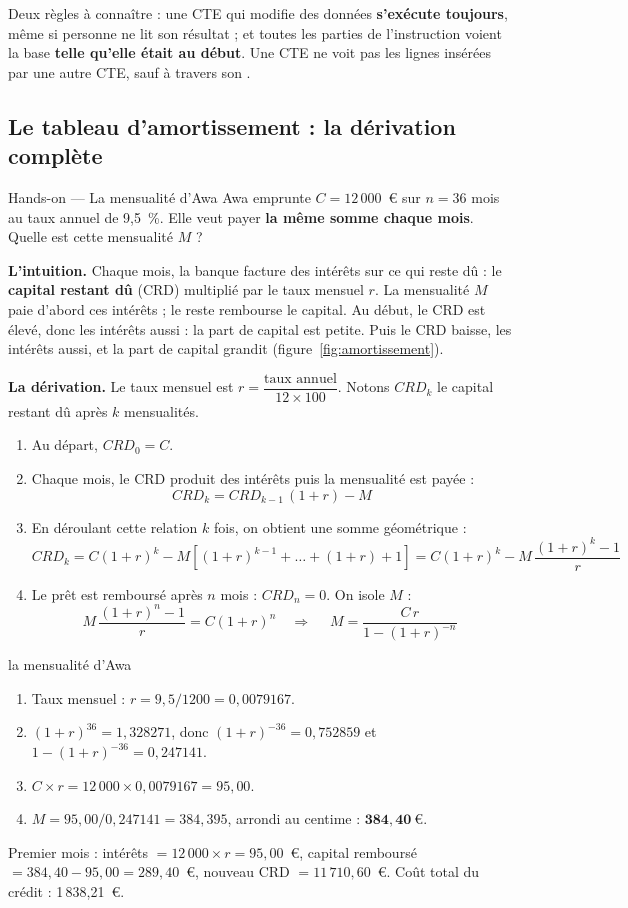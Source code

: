Deux règles à connaître : une CTE qui modifie des données \textbf{s'exécute toujours}, même si personne
ne lit son résultat ; et toutes les parties de l'instruction voient la base \textbf{telle qu'elle était
au début}. Une CTE ne voit pas les lignes insérées par une autre CTE, sauf à travers son
.

\subsection{Le tableau d'amortissement : la dérivation complète}

\begin{situation}{Hands-on --- La mensualité d'Awa}
Awa emprunte $C = 12\,000$~€ sur $n = 36$ mois au taux annuel de 9,5~\%. Elle veut payer \textbf{la même
somme chaque mois}. Quelle est cette mensualité $M$ ?
\end{situation}

\textbf{L'intuition.} Chaque mois, la banque facture des intérêts sur ce qui reste dû : le
\textbf{capital restant dû} (CRD) multiplié par le taux mensuel $r$. La mensualité $M$ paie d'abord ces
intérêts ; le reste rembourse le capital. Au début, le CRD est élevé, donc les intérêts aussi : la part
de capital est petite. Puis le CRD baisse, les intérêts aussi, et la part de capital grandit
(figure~\ref{fig:amortissement}).

\textbf{La dérivation.} Le taux mensuel est $r = \dfrac{\text{taux annuel}}{12 \times 100}$. Notons
$CRD_k$ le capital restant dû après $k$ mensualités.
\begin{enumerate}
\item Au départ, $CRD_0 = C$.
\item Chaque mois, le CRD produit des intérêts puis la mensualité est payée :
\[ CRD_k = CRD_{k-1}\,(1+r) - M \]
\item En déroulant cette relation $k$ fois, on obtient une somme géométrique :
\[ CRD_k = C(1+r)^k - M\left[(1+r)^{k-1} + \dots + (1+r) + 1\right]
         = C(1+r)^k - M\,\frac{(1+r)^k - 1}{r} \]
\item Le prêt est remboursé après $n$ mois : $CRD_n = 0$. On isole $M$ :
\[ M\,\frac{(1+r)^n - 1}{r} = C(1+r)^n \quad\Longrightarrow\quad
   \boxed{\;M = \frac{C \, r}{1 - (1+r)^{-n}}\;} \]
\end{enumerate}

\begin{calcul}{la mensualité d'Awa}
\begin{enumerate}
\item Taux mensuel : $r = 9{,}5 / 1200 = 0{,}0079167$.
\item $(1+r)^{36} = 1{,}328271$, donc $(1+r)^{-36} = 0{,}752859$ et $1 - (1+r)^{-36} = 0{,}247141$.
\item $C \times r = 12\,000 \times 0{,}0079167 = 95{,}00$.
\item $M = 95{,}00 / 0{,}247141 = 384{,}395$, arrondi au centime : $\mathbf{384{,}40~€}$.
\end{enumerate}
Premier mois : intérêts $= 12\,000 \times r = 95{,}00$~€, capital remboursé $= 384{,}40 - 95{,}00 =
289{,}40$~€, nouveau CRD $= 11\,710{,}60$~€. Coût total du crédit : 1\,838,21~€.
\end{calcul}

